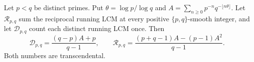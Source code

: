 \documentclass[11pt]{article}
\begin{document}
\begin{theorem}
\label{res:two-prime-transcendence}
\label{res:two-prime-repeated-transcendence}
Let $p<q$ be distinct primes.  Put $\theta=\log p/\log q$ and
$A=\sum_{n\ge0}p^{-n}q^{-\lfloor n\theta\rfloor}$.  Let
$\mathcal R_{p,q}$ sum the reciprocal running LCM at every positive
$\{p,q\}$-smooth integer, and let $\mathcal D_{p,q}$ count each distinct
running LCM once.  Then
\begin{equation}\label{eq:two-prime-affine}
 \mathcal D_{p,q}=\frac{(q-p)A+p}{q-1},\qquad
 \mathcal R_{p,q}=\frac{(p+q-1)A-(p-1)A^2}{q-1}.
\end{equation}
Both numbers are transcendental.
\end{theorem}
\end{document}
